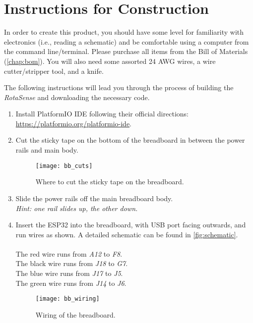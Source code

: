 \chapter{Instructions for Construction}
\label{chap:construction}

In order to create this product, you should have some level for familiarity
with electronics (i.e., reading a schematic) and be comfortable using a
computer from the command line/terminal. Please purchase all items from the
Bill of Materials (\autoref{chap:bom}). You will also need some assorted 24 AWG
wires, a wire cutter/stripper tool, and a knife.

The following instructions will lead you through the process of building the
\textit{RotaSense} and downloading the necessary code.

\begin{enumerate}
\item Install PlatformIO IDE following their official directions:
  \href{https://platformio.org/platformio-ide}{https://platformio.org/platformio-ide}.
  
\item Cut the sticky tape on the bottom of the breadboard in between the power
  rails and main body.
  \begin{figure}[H]
    \centering
    \texttt{[image: bb\_cuts]}
    \caption{Where to cut the sticky tape on the breadboard.}
    \label{fig:bb-cuts}
  \end{figure}
  
\item Slide the power rails off the main breadboard body.\\
  \textit{Hint: one rail slides up, the other down.}
  
\item Insert the ESP32 into the breadboard, with USB port facing outwards, and
  run wires as shown. A detailed schematic can be found in \autoref{fig:schematic}.\\
  \\
  The red wire runs from \textit{A12} to \textit{F8}.\\
  The black wire runs from \textit{J18} to \textit{G7}.\\
  The blue wire runs from \textit{J17} to \textit{J5}.\\
  The green wire runs from \textit{J14} to \textit{J6}.
  \begin{figure}[H]
    \centering
    \texttt{[image: bb\_wiring]}
    \caption{Wiring of the breadboard.}
  \end{figure}
  

\end{enumerate}
